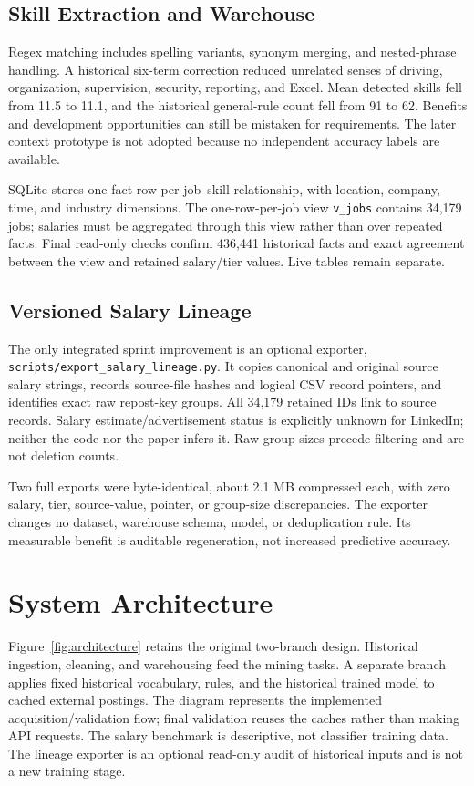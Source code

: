 \documentclass[sigconf,nonacm]{acmart}
\begin{document}
\subsection{Skill Extraction and Warehouse}
Regex matching includes spelling variants, synonym merging, and nested-phrase handling. A historical six-term correction reduced unrelated senses of driving, organization, supervision, security, reporting, and Excel. Mean detected skills fell from 11.5 to 11.1, and the historical general-rule count fell from 91 to 62. Benefits and development opportunities can still be mistaken for requirements. The later context prototype is not adopted because no independent accuracy labels are available.

SQLite stores one fact row per job--skill relationship, with location, company, time, and industry dimensions. The one-row-per-job view \texttt{v\_jobs} contains 34,179 jobs; salaries must be aggregated through this view rather than over repeated facts. Final read-only checks confirm 436,441 historical facts and exact agreement between the view and retained salary/tier values. Live tables remain separate.

\subsection{Versioned Salary Lineage}
The only integrated sprint improvement is an optional exporter, \texttt{scripts/export\_salary\_lineage.py}. It copies canonical and original source salary strings, records source-file hashes and logical CSV record pointers, and identifies exact raw repost-key groups. All 34,179 retained IDs link to source records. Salary estimate/advertisement status is explicitly unknown for LinkedIn; neither the code nor the paper infers it. Raw group sizes precede filtering and are not deletion counts.

Two full exports were byte-identical, about 2.1 MB compressed each, with zero salary, tier, source-value, pointer, or group-size discrepancies. The exporter changes no dataset, warehouse schema, model, or deduplication rule. Its measurable benefit is auditable regeneration, not increased predictive accuracy.

\section{System Architecture}
Figure~\ref{fig:architecture} retains the original two-branch design. Historical ingestion, cleaning, and warehousing feed the mining tasks. A separate branch applies fixed historical vocabulary, rules, and the historical trained model to cached external postings. The diagram represents the implemented acquisition/validation flow; final validation reuses the caches rather than making API requests. The salary benchmark is descriptive, not classifier training data. The lineage exporter is an optional read-only audit of historical inputs and is not a new training stage.
\end{document}
